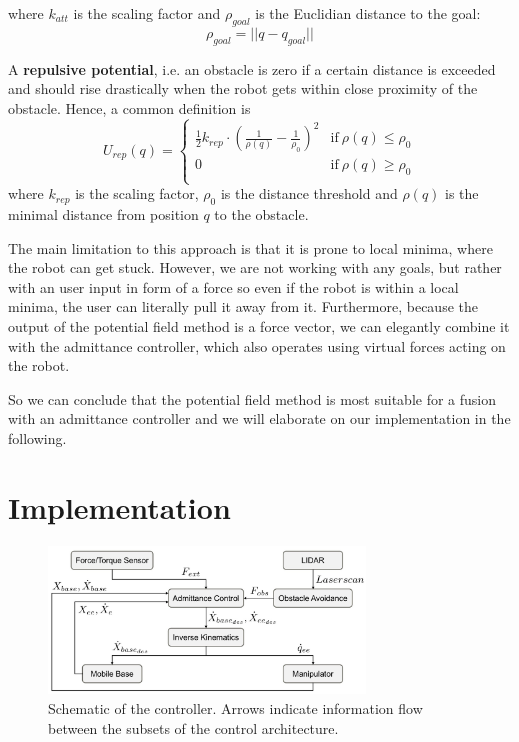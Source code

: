 where $k_{att}$ is the scaling factor and $\rho_{goal}$ is the Euclidian distance to the goal:
\begin{equation}
\rho_{goal} = ||q-q_{goal}||
\end{equation}


A \textbf{repulsive potential}, i.e. an obstacle is zero if a certain distance is exceeded and should rise drastically when the robot gets within close proximity of the obstacle. Hence, a common definition is
\begin{equation}
U_{rep}(q) = \begin{cases}
      \frac{1}{2} k_{rep}\cdot (\frac{1}{\rho (q)}-\frac{1}{\rho_0})^2 & \text{if}\ \rho (q) \leq \rho_0 \\
      0 & \text{if}\ \rho (q) \geq \rho_0 \\
    \end{cases}
\end{equation}
where $k_{rep}$ is the scaling factor, $\rho_0$ is the distance threshold and $\rho (q)$ is the minimal distance from position $q$ to the obstacle.


The main limitation to this approach is that it is prone to local minima, where the robot can get stuck. However, we are not working with any goals, but rather with an user input in form of a force so even if the robot is within a local minima, the user can literally pull it away from it. Furthermore, because the output of the potential field method is a force vector, we can elegantly combine it with the admittance controller, which also operates using virtual forces acting on the robot. 

So we can conclude that the potential field method is most suitable for a fusion with an admittance controller and we will elaborate on our implementation in the following.

\chapter{Implementation}
\begin{figure}
   \centering
   \includegraphics[width=0.75\textwidth]{images/controller_overview.jpg}
   \caption{Schematic of the controller. Arrows indicate information flow between the subsets of the control architecture.}
   \label{pics:controller_overview}
\end{figure}


